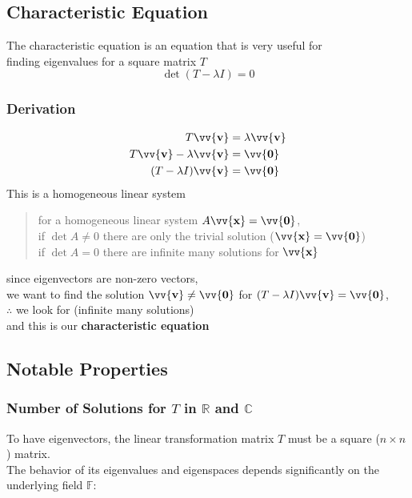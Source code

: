 \documentclass[11pt]{article}
\DeclareRobustCommand{\myvec}[1]{\vv{\mathbf{#1}}}
\newcommand{\mymat}[1]{#1}
\begin{document}
    \newpage
    \subsection{Characteristic Equation}
    The characteristic equation is an equation that is very useful for \\
    finding eigenvalues for a square matrix $\mymat{T}$
    \begin{equation}
        \det(\mymat{T}-\lambda \mymat{I}) = 0
    \end{equation}

    \subsubsection{Derivation}
    \begin{align*}
        \mymat{T}\myvec{v} &= \lambda \myvec{v}\\
        \mymat{T}\myvec{v} - \lambda \myvec{v} &= \myvec{0}\\
        (\mymat{T} - \lambda \mymat{I})\myvec{v} &= \myvec{0}
    \end{align*}
    This is a homogeneous linear system\\
    \begin{quote}
        for a homogeneous linear system $\mymat{A}\myvec{x} = \myvec{0}$, \\
        \quad if $\det\mymat{A}\ne0$ \quad there are only the trivial solution ($\myvec{x} = \myvec{0}$) \\
        \quad if $\det\mymat{A}=0$ \quad there are infinite many solutions for $\myvec{x}$
    \end{quote}

    since eigenvectors are non-zero vectors, \\
    we want to find the solution $\myvec{v} \ne \myvec{0}$ for $(\mymat{T} - \lambda \mymat{I})\myvec{v} = \myvec{0}$,\\
    $\therefore$ we look for \fbox{$\det(\mymat{T} - \lambda \mymat{I}) = 0$} \quad (infinite many solutions)\\
    and this is our \textbf{characteristic equation}


    \newpage
    \subsection{Notable Properties}
    \subsubsection{Number of Solutions for $\mymat{T}$ in $\mathbb{R}$ and $\mathbb{C}$}
    To have eigenvectors, the linear transformation matrix $\mymat{T}$ must be a square ($n \times n$) matrix. \\
    The behavior of its eigenvalues and eigenspaces depends significantly on the underlying field $\mathbb{F}$:
\end{document}
